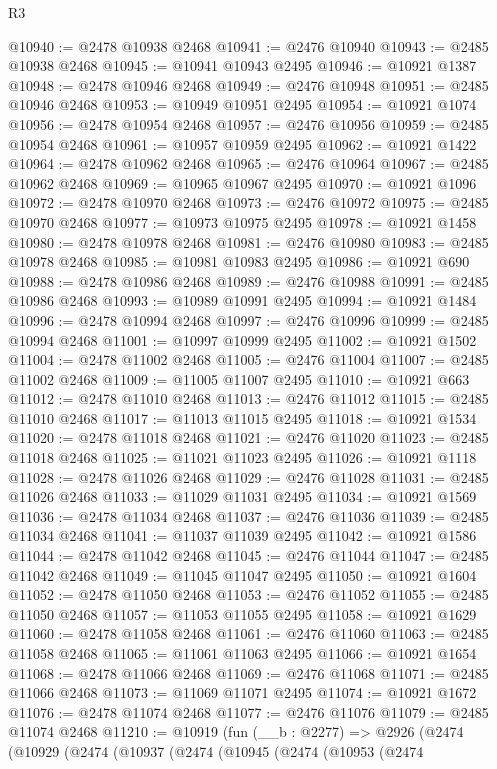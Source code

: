 \begin{lexlean}{R3}
\begin{coremodule}
@10940 := @2478 @10938 @2468
@10941 := @2476 @10940
@10943 := @2485 @10938 @2468
@10945 := @10941 @10943 @2495
@10946 := @10921 @1387
@10948 := @2478 @10946 @2468
@10949 := @2476 @10948
@10951 := @2485 @10946 @2468
@10953 := @10949 @10951 @2495
@10954 := @10921 @1074
@10956 := @2478 @10954 @2468
@10957 := @2476 @10956
@10959 := @2485 @10954 @2468
@10961 := @10957 @10959 @2495
@10962 := @10921 @1422
@10964 := @2478 @10962 @2468
@10965 := @2476 @10964
@10967 := @2485 @10962 @2468
@10969 := @10965 @10967 @2495
@10970 := @10921 @1096
@10972 := @2478 @10970 @2468
@10973 := @2476 @10972
@10975 := @2485 @10970 @2468
@10977 := @10973 @10975 @2495
@10978 := @10921 @1458
@10980 := @2478 @10978 @2468
@10981 := @2476 @10980
@10983 := @2485 @10978 @2468
@10985 := @10981 @10983 @2495
@10986 := @10921 @690
@10988 := @2478 @10986 @2468
@10989 := @2476 @10988
@10991 := @2485 @10986 @2468
@10993 := @10989 @10991 @2495
@10994 := @10921 @1484
@10996 := @2478 @10994 @2468
@10997 := @2476 @10996
@10999 := @2485 @10994 @2468
@11001 := @10997 @10999 @2495
@11002 := @10921 @1502
@11004 := @2478 @11002 @2468
@11005 := @2476 @11004
@11007 := @2485 @11002 @2468
@11009 := @11005 @11007 @2495
@11010 := @10921 @663
@11012 := @2478 @11010 @2468
@11013 := @2476 @11012
@11015 := @2485 @11010 @2468
@11017 := @11013 @11015 @2495
@11018 := @10921 @1534
@11020 := @2478 @11018 @2468
@11021 := @2476 @11020
@11023 := @2485 @11018 @2468
@11025 := @11021 @11023 @2495
@11026 := @10921 @1118
@11028 := @2478 @11026 @2468
@11029 := @2476 @11028
@11031 := @2485 @11026 @2468
@11033 := @11029 @11031 @2495
@11034 := @10921 @1569
@11036 := @2478 @11034 @2468
@11037 := @2476 @11036
@11039 := @2485 @11034 @2468
@11041 := @11037 @11039 @2495
@11042 := @10921 @1586
@11044 := @2478 @11042 @2468
@11045 := @2476 @11044
@11047 := @2485 @11042 @2468
@11049 := @11045 @11047 @2495
@11050 := @10921 @1604
@11052 := @2478 @11050 @2468
@11053 := @2476 @11052
@11055 := @2485 @11050 @2468
@11057 := @11053 @11055 @2495
@11058 := @10921 @1629
@11060 := @2478 @11058 @2468
@11061 := @2476 @11060
@11063 := @2485 @11058 @2468
@11065 := @11061 @11063 @2495
@11066 := @10921 @1654
@11068 := @2478 @11066 @2468
@11069 := @2476 @11068
@11071 := @2485 @11066 @2468
@11073 := @11069 @11071 @2495
@11074 := @10921 @1672
@11076 := @2478 @11074 @2468
@11077 := @2476 @11076
@11079 := @2485 @11074 @2468
@11210 := @10919
    (fun (__b : @2277) =>
    @2926
      (@2474
        (@10929
          (@2474
            (@10937
              (@2474
                (@10945
                  (@2474
                    (@10953
                      (@2474

\end{coremodule}
\end{lexlean}
